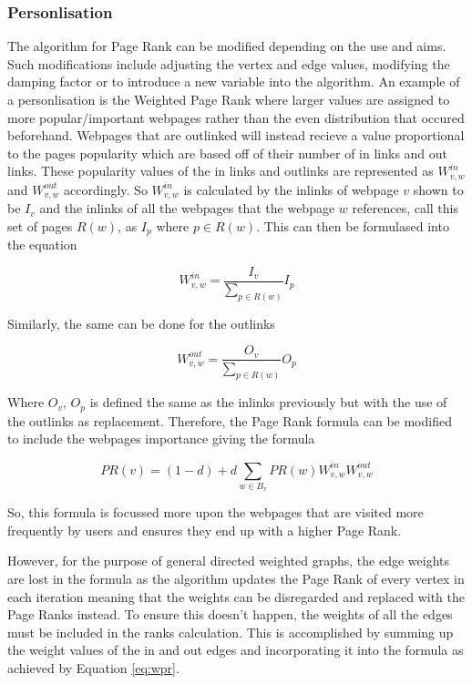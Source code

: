 \subsubsection{Personlisation}
The algorithm for Page Rank can be modified depending on the use and aims. Such modifications include adjusting the vertex and edge values, modifying the damping factor or to introduce a new variable into the algorithm. An example of a personlisation is the Weighted Page Rank\cite{xing2004weighted} where larger values are assigned to more popular/important webpages rather than the even distribution that occured beforehand. Webpages that are outlinked will instead recieve a value proportional to the pages popularity which are based off of their number of in links and out links. These popularity values of the in links and outlinks are represented as $W^{in}_{v,w}$ and $W^{out}_{v,w}$ accordingly. So $W^{in}_{v,w}$ is calculated by the inlinks of webpage $v$ shown to be $I_v$ and the inlinks of all the webpages that the webpage $w$ references, call this set of pages $R(w)$, as $I_p$ where $p \in R(w)$. This can then be formulased into the equation

\begin{equation}
W^{in}_{v,w} = \frac{I_v}{\sum_{p \in R(w)}}{I_p}
\end{equation}

Similarly, the same can be done for the outlinks 

\begin{equation}
W^{out}_{v,w} = \frac{O_v}{\sum_{p \in R(w)}}{O_p}
\end{equation}

Where $O_v$, $O_p$ is defined the same as the inlinks previously but with the use of the outlinks as replacement. Therefore, the Page Rank formula can be modified to include the webpages importance giving the formula

\begin{equation}
PR(v) = (1 - d) + d\sum_{w \in B_v}PR(w)W^{in}_{v,w}W^{out}_{v,w}
\end{equation}

So, this formula is focussed more upon the webpages that are visited more frequently by users and ensures they end up with a higher Page Rank. 

However, for the purpose of general directed weighted graphs, the edge weights are lost in the formula as the algorithm updates the Page Rank of every vertex in each iteration meaning that the weights can be disregarded and replaced with the Page Ranks instead. To ensure this doesn't happen, the weights of all the edges must be included in the ranks calculation. This is accomplished by summing up the weight values of the in and out edges and incorporating it into the formula as achieved by Equation \ref{eq:wpr}.

